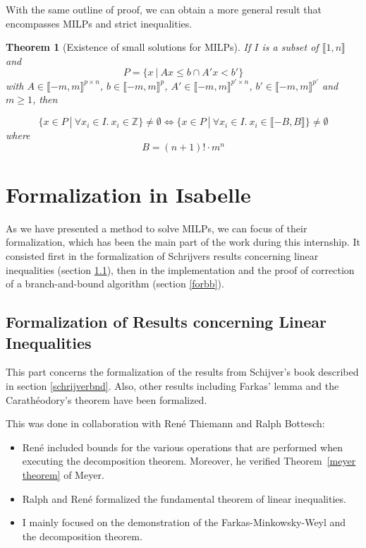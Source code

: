 \documentclass{article}
\newcommand{\ints}{\mathbb{Z}}
\newtheorem{theorem}{Theorem}
\begin{document}
With the same outline of proof, we can obtain a more general result that
encompasses MILPs and strict inequalities. 

\begin{theorem}[Existence of small solutions for MILPs]
  \label{small-milp}
  If $I$ is a subset of $\llbracket 1, n \rrbracket$ and
  $$P = \{x~|~Ax \leqslant b \cap A'x < b'\}$$ with
  $A \in \llbracket -m, m \rrbracket^{p \times n}$,
  $b \in \llbracket -m, m \rrbracket^p$,
  $A' \in \llbracket -m, m \rrbracket^{p' \times n}$,
  $b' \in \llbracket -m, m \rrbracket^{p'}$ and $m \geqslant 1$, then

  $$\{x \in P~|~\forall x_i \in I.~x_i \in \ints\} \neq \emptyset
      \Longleftrightarrow
    \{x \in P~|~\forall x_i \in I.~x_i \in \llbracket -B, B \rrbracket\}
      \neq \emptyset$$
  where
  $$B = (n + 1)! \cdot m^n$$
\end{theorem}

\section{Formalization in Isabelle}
As we have presented a method to solve MILPs, we can focus of their
formalization, which has been the main part of the work during this internship.
It consisted first in the formalization of Schrijvers results concerning linear
inequalities (section \ref{forlineq}), then in the implementation and the proof
of correction of a branch-and-bound algorithm (section \ref{forbb}).

\subsection{Formalization of Results concerning Linear Inequalities}
\label{forlineq}
This part concerns the formalization of the results from Schijver's book
described in section \ref{schrijverbnd}.
Also, other results including Farkas' lemma and the Carathéodory's theorem
have been formalized.

This was done in collaboration with René Thiemann and Ralph Bottesch:
\begin{itemize}
  \item René included bounds for the various operations that are performed 
  when executing the decomposition theorem.  Moreover, he verified Theorem~\ref{meyer theorem}
  of Meyer. 
  \item Ralph and René formalized the fundamental theorem of linear
    inequalities.
  \item I mainly focused on the demonstration of the Farkas-Minkowsky-Weyl and
    the decomposition theorem.
\end{itemize}
\end{document}
